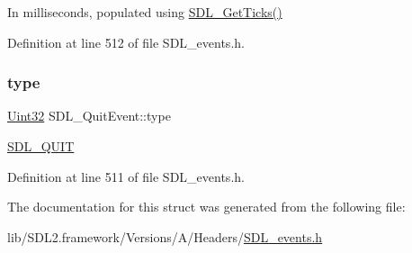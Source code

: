 In milliseconds, populated using \mbox{\hyperlink{_s_d_l__timer_8h_a0b9bc71d6287e0ffafdc3419760fe2b3}{S\+D\+L\+\_\+\+Get\+Ticks()}} 

Definition at line 512 of file S\+D\+L\+\_\+events.\+h.

\mbox{\label{struct_s_d_l___quit_event_a51ab0279e6de40249ba93971a8757cf0}} 
\subsubsection{\texorpdfstring{type}{type}}
{\footnotesize\ttfamily \mbox{\hyperlink{_s_d_l__stdinc_8h_add440eff171ea5f55cb00c4a9ab8672d}{Uint32}} S\+D\+L\+\_\+\+Quit\+Event\+::type}

\mbox{\hyperlink{_s_d_l__events_8h_a3b589e89be6b35c02e0dd34a55f3fccaa31acc5fdafc86ebe2c1f5c3cae48d603}{S\+D\+L\+\_\+\+Q\+U\+IT}} 

Definition at line 511 of file S\+D\+L\+\_\+events.\+h.



The documentation for this struct was generated from the following file\+:\begin{DoxyCompactItemize}
\item 
lib/\+S\+D\+L2.\+framework/\+Versions/\+A/\+Headers/\mbox{\hyperlink{_s_d_l__events_8h}{S\+D\+L\+\_\+events.\+h}}\end{DoxyCompactItemize}
